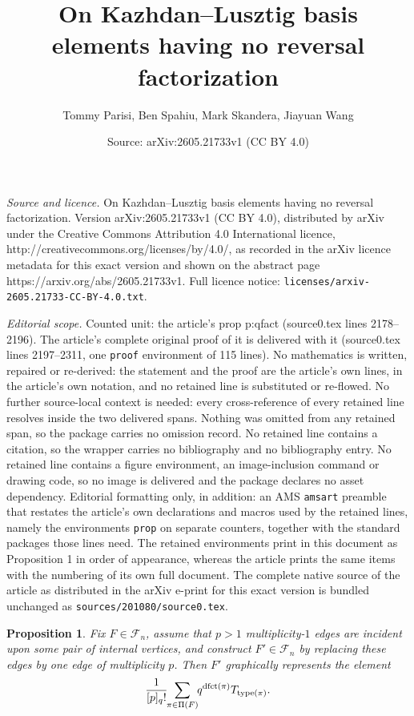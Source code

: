 \documentclass[10pt,a4paper]{amsart}
\title{On Kazhdan--Lusztig basis elements having no reversal factorization}
\author{Tommy Parisi, Ben Spahiu, Mark Skandera, Jiayuan Wang}
\date{Source: arXiv:2605.21733v1 (CC BY 4.0)}
\newtheorem{prop}{Proposition}
\newcommand{\ctr}[1]{{x}_{#1}}
\newcommand{\dfct}{\mathrm{dfct}}
\newcommand{\ntksp}{\negthickspace}
\newcommand{\ocnet}[1]{\mathcal F_{#1}}%
\newcommand{\sn}{\mathfrak{S}_n}
\newcommand{\type}{\mathrm{type}}
\begin{document}
\maketitle

\noindent\emph{Source and licence.} On Kazhdan--Lusztig basis elements having no reversal factorization. Version arXiv:2605.21733v1 (CC BY 4.0), distributed by arXiv under the Creative Commons Attribution 4.0 International licence, http://creativecommons.org/licenses/by/4.0/, as recorded in the arXiv licence metadata for this exact version and shown on the abstract page https://arxiv.org/abs/2605.21733v1. Full licence notice: \texttt{licenses/arxiv-2605.21733-CC-BY-4.0.txt}.\par\smallskip

\noindent\textit{Editorial scope.} Counted unit: the article's prop p:qfact (source0.tex lines 2178--2196). The article's complete original proof of it is delivered with it (source0.tex lines 2197--2311, one \texttt{proof} environment of 115 lines). No mathematics is written, repaired or re-derived: the statement and the proof are the article's own lines, in the article's own notation, and no retained line is substituted or re-flowed.  No further source-local context is needed: every cross-reference of every retained line resolves inside the two delivered spans.  Nothing was omitted from any retained span, so the package carries no omission record.  No retained line contains a citation, so the wrapper carries no bibliography and no bibliography entry.  No retained line contains a figure environment, an image-inclusion command or drawing code, so no image is delivered and the package declares no asset dependency.  Editorial formatting only, in addition: an AMS \texttt{amsart} preamble that restates the article's own declarations and macros used by the retained lines, namely the environments \texttt{prop} on separate counters, together with the standard packages those lines need.  The retained environments print in this document as Proposition 1 in order of appearance, whereas the article prints the same items with the numbering of its own full document.  The complete native source of the article as distributed in the arXiv e-print for this exact version is bundled unchanged as \texttt{sources/201080/source0.tex}.
\begin{prop}\label{p:qfact}
    Fix $F \in \ocnet n$, assume that %
$p > 1$
multiplicity-$1$ edges are incident upon some pair of internal vertices, and construct $F' \in \ocnet n$ by replacing these edges by one edge of multiplicity $p$.
Then $F'$ graphically represents the element
    \begin{equation*}
     \frac 1{[p]_q!} 
     \ntksp\sum_{\pi \in \Pi(F)}\ntksp q^{\dfct(\pi)}T_{\type(\pi)}.
     \end{equation*}
\end{prop}
\end{document}
